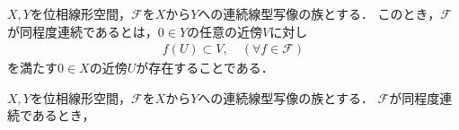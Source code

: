 	\begin{screen}
		\begin{dfn}[位相線型空間における同程度連続性]
			$X,Y$を位相線形空間，$\mathscr{F}$を$X$から$Y$への連続線型写像の族とする．
			このとき，$\mathscr{F}$が同程度連続であるとは，$0 \in Y$の任意の近傍$V$に対し
			\begin{align}
				f(U) \subset V,\quad (\forall f \in \mathscr{F})
			\end{align}
			を満たす$0 \in X$の近傍$U$が存在することである．
		\end{dfn}
	\end{screen}
	
	\begin{screen}
		\begin{thm}[同程度連続な写像族の有界性]
			$X,Y$を位相線形空間，$\mathscr{F}$を$X$から$Y$への連続線型写像の族とする．
			$\mathscr{F}$が同程度連続であるとき，
		\end{thm}
	\end{screen}